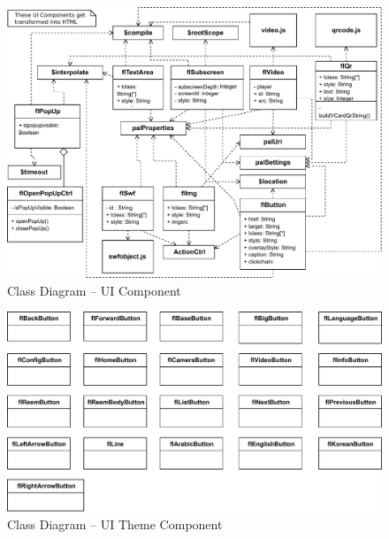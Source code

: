 \begin{figure}
    \centering
    \includegraphics{figures/design-class-uicomponent.pdf}
    \caption{Class Diagram -- UI Component}
    \label{fig:class-uicomponent}
\end{figure}

\begin{figure}
    \centering
    \includegraphics{figures/design-class-themecomponents.pdf}
    \caption{Class Diagram -- UI Theme Component}
    \label{fig:class-themecomponent}
\end{figure}

